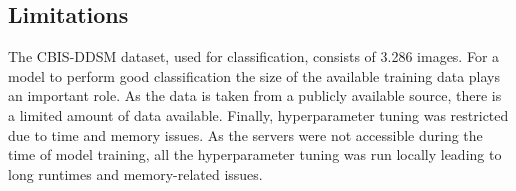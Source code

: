 \documentclass[sn-mathphys,Numbered]{sn-jnl}%
\theoremstyle{thmstyleone}%
\theoremstyle{thmstyletwo}%
\theoremstyle{thmstylethree}%
\begin{document}
\subsection{Limitations}
\label{limitation}
The CBIS-DDSM dataset, used for classification, consists of 3.286 images. For a model to perform good classification the size of the available training data plays an important role. As the data is taken from a publicly available source, there is a limited amount of data available. Finally, hyperparameter tuning was restricted due to time and memory issues. As the servers were not accessible during the time of model training, all the hyperparameter tuning was run locally leading to long runtimes and memory-related issues.
\newpage

\end{document}
